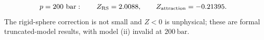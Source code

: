 \[
p=200\ \mathrm{bar}:\qquad
Z_{\rm RS}=2.0088,\qquad Z_{\rm attraction}=-0.21395.
\]
The rigid-sphere correction is not small and $Z<0$ is unphysical;
these are formal truncated-model results, with model (ii) invalid at $200\ \mathrm{bar}$.
